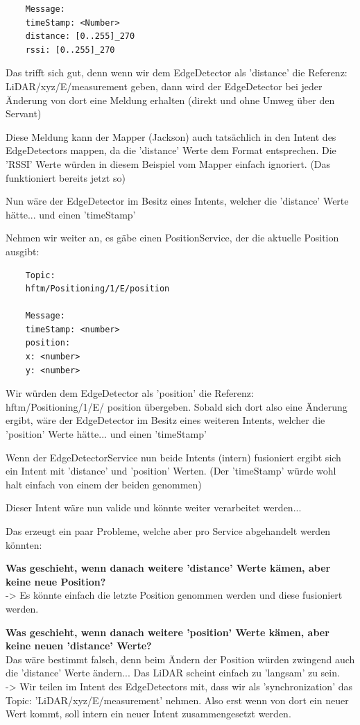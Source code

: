 \begin{formal}
\begin{verbatim}
	Message:
	timeStamp: <Number>
	distance: [0..255]_270
	rssi: [0..255]_270
	\end{verbatim}
	
	Das trifft sich gut, denn wenn wir dem EdgeDetector als 'distance' die Referenz: LiDAR/xyz/E/measurement geben, dann wird der EdgeDetector bei jeder Änderung von dort eine Meldung erhalten (direkt und ohne Umweg über den Servant)
	
	Diese Meldung kann der Mapper (Jackson) auch tatsächlich in den Intent des EdgeDetectors mappen, da die 'distance' Werte dem Format entsprechen. Die 'RSSI' Werte würden in diesem Beispiel vom Mapper einfach ignoriert. (Das funktioniert bereits jetzt so)
	
	Nun wäre der EdgeDetector im Besitz eines Intents, welcher die 'distance' Werte hätte... und einen 'timeStamp'
	
	Nehmen wir weiter an, es gäbe einen PositionService, der die aktuelle Position ausgibt:
	\begin{verbatim}
	Topic:
	hftm/Positioning/1/E/position
	
	Message:
	timeStamp: <number>
	position:
	x: <number>
	y: <number>
	\end{verbatim}
	
	Wir würden dem EdgeDetector als 'position' die Referenz: hftm/Positioning/1/E/ position übergeben. Sobald sich dort also eine Änderung ergibt, wäre der EdgeDetector im Besitz eines weiteren Intents, welcher die 'position' Werte hätte... und einen 'timeStamp'
	
	Wenn der EdgeDetectorService nun beide Intents (intern) fusioniert ergibt sich ein Intent mit 'distance' und 'position' Werten. (Der 'timeStamp' würde wohl halt einfach von einem der beiden genommen)
	
	Dieser Intent wäre nun valide und könnte weiter verarbeitet werden...
	
	
	Das erzeugt ein paar Probleme, welche aber pro Service abgehandelt werden könnten:
	
	\textbf{Was geschieht, wenn danach weitere 'distance' Werte kämen, aber keine neue Position?}\\
	-> Es könnte einfach die letzte Position genommen werden und diese fusioniert werden.
	
	\textbf{Was geschieht, wenn danach weitere 'position' Werte kämen, aber keine neuen 'distance' Werte?}\\
	Das wäre bestimmt falsch, denn beim Ändern der Position würden zwingend auch die 'distance' Werte ändern... Das LiDAR scheint einfach zu 'langsam' zu sein.\\
	-> Wir teilen im Intent des EdgeDetectors mit, dass wir als 'synchronization' das Topic: 'LiDAR/xyz/E/measurement' nehmen. Also erst wenn von dort ein neuer Wert kommt, soll intern ein neuer Intent zusammengesetzt werden.
	

\end{formal}
